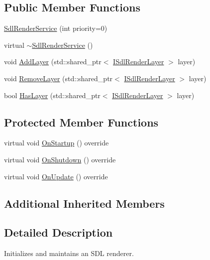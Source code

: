 \subsection*{Public Member Functions}
\begin{DoxyCompactItemize}
\item 
\hyperlink{classastu_1_1SdlRenderService_a8669793d9701f979c90cd802575a2645}{Sdl\+Render\+Service} (int priority=0)
\item 
virtual \hyperlink{classastu_1_1SdlRenderService_a0ec8c27982cfa6ace6b28e50fba78f2a}{$\sim$\+Sdl\+Render\+Service} ()
\item 
void \hyperlink{classastu_1_1SdlRenderService_af025dba6e6ada1f09badaa6de75292d1}{Add\+Layer} (std\+::shared\+\_\+ptr$<$ \hyperlink{classastu_1_1ISdlRenderLayer}{I\+Sdl\+Render\+Layer} $>$ layer)
\item 
void \hyperlink{classastu_1_1SdlRenderService_a88ffe81ca6348b12b0185310932bd4ee}{Remove\+Layer} (std\+::shared\+\_\+ptr$<$ \hyperlink{classastu_1_1ISdlRenderLayer}{I\+Sdl\+Render\+Layer} $>$ layer)
\item 
bool \hyperlink{classastu_1_1SdlRenderService_a45016463f301b52b1ffacfa976eb9849}{Has\+Layer} (std\+::shared\+\_\+ptr$<$ \hyperlink{classastu_1_1ISdlRenderLayer}{I\+Sdl\+Render\+Layer} $>$ layer)
\end{DoxyCompactItemize}
\subsection*{Protected Member Functions}
\begin{DoxyCompactItemize}
\item 
virtual void \hyperlink{classastu_1_1SdlRenderService_a38abd541e8075e5e4eb702ca99c9b0a5}{On\+Startup} () override
\item 
virtual void \hyperlink{classastu_1_1SdlRenderService_a4f21478ca10de11d260792c3ccd79eef}{On\+Shutdown} () override
\item 
virtual void \hyperlink{classastu_1_1SdlRenderService_af109517e98ab8bce1e625122a441fb75}{On\+Update} () override
\end{DoxyCompactItemize}
\subsection*{Additional Inherited Members}


\subsection{Detailed Description}
Initializes and maintains an S\+DL renderer.

